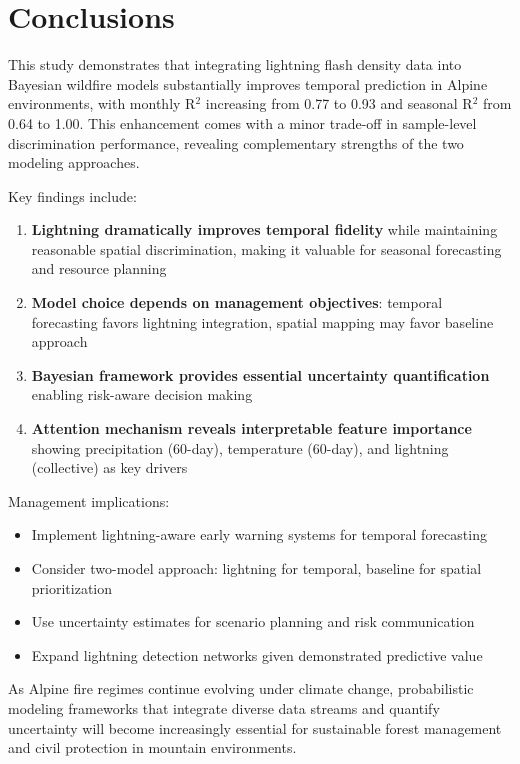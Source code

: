 \documentclass[11pt,a4paper]{article}
\begin{document}
\section{Conclusions}

This study demonstrates that integrating lightning flash density data into Bayesian wildfire models substantially improves temporal prediction in Alpine environments, with monthly R$^2$ increasing from 0.77 to 0.93 and seasonal R$^2$ from 0.64 to 1.00. This enhancement comes with a minor trade-off in sample-level discrimination performance, revealing complementary strengths of the two modeling approaches.

Key findings include:

\begin{enumerate}
    \item \textbf{Lightning dramatically improves temporal fidelity} while maintaining reasonable spatial discrimination, making it valuable for seasonal forecasting and resource planning
    \item \textbf{Model choice depends on management objectives}: temporal forecasting favors lightning integration, spatial mapping may favor baseline approach
    \item \textbf{Bayesian framework provides essential uncertainty quantification} enabling risk-aware decision making
    \item \textbf{Attention mechanism reveals interpretable feature importance} showing precipitation (60-day), temperature (60-day), and lightning (collective) as key drivers
\end{enumerate}

Management implications:
\begin{itemize}
    \item Implement lightning-aware early warning systems for temporal forecasting
    \item Consider two-model approach: lightning for temporal, baseline for spatial prioritization
    \item Use uncertainty estimates for scenario planning and risk communication
    \item Expand lightning detection networks given demonstrated predictive value
\end{itemize}

As Alpine fire regimes continue evolving under climate change, probabilistic modeling frameworks that integrate diverse data streams and quantify uncertainty will become increasingly essential for sustainable forest management and civil protection in mountain environments.
\end{document}
